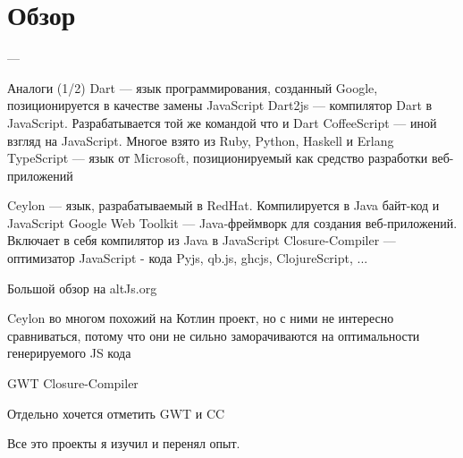 \chapter{Обзор}


---

Аналоги (1/2)
Dart — язык программирования, созданный Google, позиционируется в качестве замены JavaScript
Dart2js — компилятор Dart в JavaScript. Разрабатывается той же командой что и Dart
CoffeeScript — иной взгляд на JavaScript. Многое взято из Ruby, Python, Haskell и Erlang
TypeScript — язык от Microsoft, позиционируемый как средство разработки веб-приложений

Ceylon — язык, разрабатываемый в RedHat. Компилируется в Java байт-код и JavaScript
Google Web Toolkit — Java-фреймворк для создания веб-приложений. Включает в себя компилятор из Java в JavaScript
Closure-Compiler — оптимизатор JavaScript - кода
Pyjs, qb.js, ghcjs, ClojureScript, ...


Большой обзор на altJs.org

Ceylon во многом похожий на Котлин проект, но с ними не интересно сравниваться, потому что они не сильно заморачиваются на оптимальности генерируемого JS кода

GWT
Closure-Compiler

Отдельно хочется отметить GWT и CC 

Все это проекты я изучил и перенял опыт.




